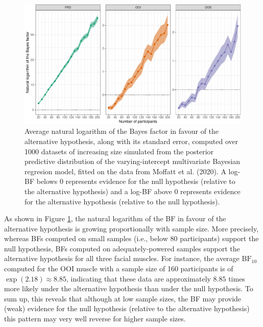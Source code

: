 \documentclass[
  english,
  man, donotrepeattitle,floatsintext]{apa6}
\begin{document}
\begin{figure}[!htb]

{\centering \includegraphics[width=1\linewidth]{manuscript_files/figure-latex/simulated-power-1} 

}

\caption{Average natural logarithm of the Bayes factor in favour of the alternative hypothesis, along with its standard error, computed over 1000 datasets of increasing size simulated from the posterior predictive distribution of the varying-intercept multivariate Bayesian regresion model, fitted on the data from Moffatt et al. (2020). A log-BF belows 0 represents evidence for the null hypothesis (relative to the alternative hypothesis) and a log-BF above 0 represents evidence for the alternative hypothesis (relative to the null hypothesis).}\label{fig:simulated-power}
\end{figure}

As shown in Figure \ref{fig:simulated-power}, the natural logarithm of the BF in favour of the alternative hypothesis is growing proportionally with sample size. More precisely, whereas BFs computed on small samples (i.e., below 80 participants) support the null hypothesis, BFs computed on adequately-powered samples support the alternative hypothesis for all three facial muscles. For instance, the average \(\text{BF}_{10}\) computed for the OOI muscle with a sample size of 160 participants is of \(\exp(2.18) \approx 8.85\), indicating that these data are approximately \(8.85\) times more likely under the alternative hypothesis than under the null hypothesis. To sum up, this reveals that although at low sample sizes, the BF may provide (weak) evidence for the null hypothesis (relative to the alternative hypothesis) this pattern may very well reverse for higher sample sizes.
\end{document}
